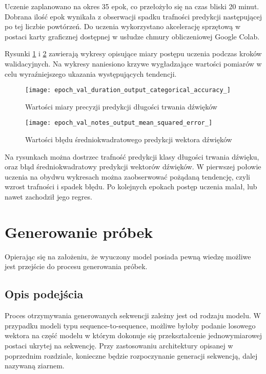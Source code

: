 {{        Uczenie zaplanowano na okres 35 epok, co przełożyło się na czas bliski 20 minut. Dobrana ilość epok wynikała 
        z obserwacji spadku trafności predykcji następującej po tej liczbie powtórzeń. Do uczenia wykorzystano
        akcelerację sprzętową w postaci karty graficznej dostępnej w usłudze chmury obliczeniowej Google Colab.

        Rysunki \ref{epoch_val_duration_output_categorical_accuracy_} i \ref{epoch_val_notes_output_mean_squared_error_} zawierają wykresy opisujące miary postępu uczenia podczas kroków walidacyjnych. Na wykresy naniesiono krzywe wygładzające wartości pomiarów w celu wyraźniejszego ukazania występujących tendencji.

        \begin{figure}[H]
            \centering
            \texttt{[image: epoch\_val\_duration\_output\_categorical\_accuracy\_]}
            \caption{Wartości miary precyzji predykcji długości trwania dźwięków}
            \label{epoch_val_duration_output_categorical_accuracy_}
        \end{figure}

        \begin{figure}[H]
            \centering
            \texttt{[image: epoch\_val\_notes\_output\_mean\_squared\_error\_]}
            \caption{Wartości błędu średniokwadratowego predykcji wektora dźwięków}
            \label{epoch_val_notes_output_mean_squared_error_}
        \end{figure}

        Na rysunkach można dostrzec trafność predykcji klasy długości trwania dźwięku, oraz błąd średniokwadratowy
        predykcji wektorów dźwięków. W pierwszej połowie uczenia na obydwu wykresach można zaobserwować pożądaną tendencję,
        czyli wzrost trafności i spadek błędu. Po kolejnych epokach postęp uczenia malał, lub nawet zachodził jego regres.
    }

    \section{Generowanie próbek}
    {
        Opierając się na założeniu, że wyuczony model posiada pewną wiedzę możliwe jest przejście do procesu generowania próbek.

        \subsection{Opis podejścia}
        {
            Proces otrzymywania generowanych sekwencji zależny jest od rodzaju modelu.
            W przypadku modeli typu sequence-to-sequence, możliwe byłoby podanie losowego 
            wektora na część modelu w którym dokonuje się przekształcenie jednowymiarowej postaci ukrytej na sekwencję.
            Przy zastosowaniu architektury opisanej w poprzednim rozdziale, konieczne będzie 
            rozpoczynanie generacji sekwencją, dalej nazywaną ziarnem. 

}}}
